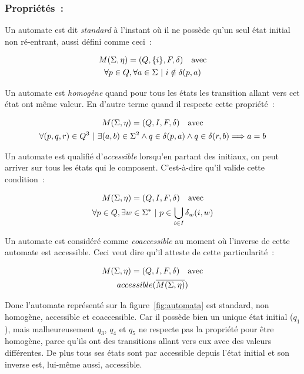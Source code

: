 \vphantom{}

\subsubsection*{Propriétés~:}

Un automate est dit \textit{standard} à l'instant où il ne possède qu'un seul
état initial non ré-entrant, aussi défini comme ceci~:

\begin{gather}
    M(\Sigma, \eta) = (Q, \{i\}, F, \delta) \quad \text{avec} \\
    \forall p \in Q, \forall a \in \Sigma ~|~ i \notin \delta(p, a) \notag
\end{gather}

Un automate est \textit{homogène} quand pour tous les états les transition
allant vers cet état ont même valeur. En d'autre terme quand il respecte cette
propriété~:

\begin{gather}
    M(\Sigma, \eta) = (Q, I, F, \delta) \quad \text{avec} \\
    \forall (p, q, r) \in Q^3 ~|~ \exists (a, b) \in \Sigma^2 \land q \in \delta(p, a) \land q \in \delta(r, b) \Longrightarrow a = b\notag
\end{gather}

Un automate est qualifié d'\textit{accessible} lorsqu'en partant des initiaux,
on peut arriver sur tous les états qui le composent. C'est-à-dire qu'il valide
cette condition~:

\begin{gather}
    M(\Sigma, \eta) = (Q, I, F, \delta) \quad \text{avec} \\
    \forall p \in Q, \exists w \in \Sigma^* ~|~ p \in \bigcup_{i \in I} \delta_w(i, w) \notag
\end{gather}

Un automate est considéré comme \textit{coaccessible} au moment où l'inverse de
cette automate est accessible. Ceci veut dire qu'il atteste de cette
particularité~:

\begin{gather}
    M(\Sigma, \eta) = (Q, I, F, \delta) \quad \text{avec} \\
    accessible(\overline{M(\Sigma, \eta)}) \notag
\end{gather}

Donc l'automate représenté sur la figure~\ref{fig:automata} est standard, non
homogène, accessible et coaccessible. Car il possède bien un unique état
initial (\(q_1\)), mais malheureusement \(q_3\), \(q_4\) et \(q_5\) ne respecte
pas la propriété pour être homogène, parce qu'ils ont des transitions allant
vers eux avec des valeurs différentes. De plus tous ses états sont par
accessible depuis l'état initial et son inverse est, lui-même aussi,
accessible.

